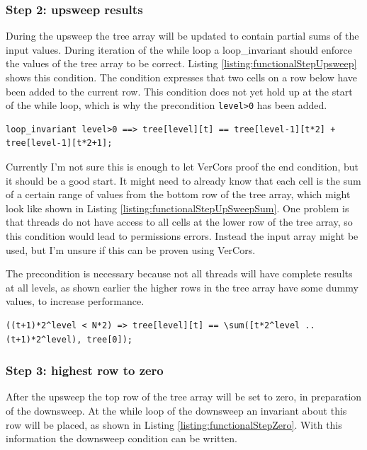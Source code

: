 \documentclass[a4paper]{article}
\newcommand{\code}[1]{\texttt{\small \color{inline}#1}} %
\begin{document}
\subsubsection{Step 2: upsweep results}
During the upsweep the tree array will be updated to contain partial sums of the input values. During iteration of the while loop a loop\_invariant should enforce the values of the tree array to be correct. Listing \ref{listing:functionalStepUpsweep} shows this condition. The condition expresses that two cells on a row below have been added to the current row. This condition does not yet hold up at the start of the while loop, which is why the precondition \code{level>0} has been added.

\begin{lstlisting}[caption=Upsweep loop\_invariant enforcing the results of the computation, label=listing:functionalStepUpsweep, float=htpb]
loop_invariant level>0 ==> tree[level][t] == tree[level-1][t*2] + tree[level-1][t*2+1];
\end{lstlisting}

Currently I'm not sure this is enough to let VerCors proof the end condition, but it should be a good start. It might need to already know that each cell is the sum of a certain range of values from the bottom row of the tree array, which might look like shown in Listing \ref{listing:functionalStepUpSweepSum}. One problem is that threads do not have access to all cells at the lower row of the tree array, so this condition would lead to permissions errors. Instead the input array might be used, but I'm unsure if this can be proven using VerCors. 

The precondition is necessary because not all threads will have complete results at all levels, as shown earlier the higher rows in the tree array have some dummy values, to increase performance.

\begin{lstlisting}[caption=Upsweep loop\_invariant enforcing sum of inputs, label=listing:functionalStepUpsweepSum, float=htpb]
((t+1)*2^level < N*2) => tree[level][t] == \sum([t*2^level ..(t+1)*2^level), tree[0]);
\end{lstlisting}

\subsubsection{Step 3: highest row to zero}
After the upsweep the top row of the tree array will be set to zero, in preparation of the downsweep. At the while loop of the downsweep an invariant about this row will be placed, as shown in Listing \ref{listing:functionalStepZero}. With this information the downsweep condition can be written.
\end{document}
